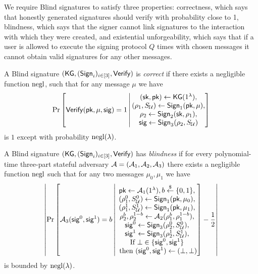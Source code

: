We require Blind signatures to satisfy three properties: correctness, which says that honestly generated signatures should verify with probability close to 1, blindness, which says that the signer cannot link signatures to the interaction with which they were created, and existential unforgeability, which says that if a user is allowed to execute the signing protocol $Q$ times with chosen messages it cannot obtain valid signatures for any other messages.

\begin{definition}[Correctness] \label{def:bs-correctness}
    A Blind signature $(\mathsf{KG},(\mathsf{Sign}_i)_{i\in [3]},\mathsf{Verify})$ is \emph{correct} if there exists a negligible function $\mathrm{negl}$, such that for any message $\mu$ we have \[
        \Pr \left[ \mathsf{Verify}(\mathsf{pk},\mu,\mathsf{sig}) = 1 \, \middle | \, \begin{matrix}
            (\mathsf{sk},\mathsf{pk}) \gets \mathsf{KG}(1^\lambda), \\
            (\rho_1, S_{\mathcal{U}}) \gets \mathsf{Sign}_1(\mathsf{pk}, \mu), \\
            \rho_2 \gets \mathsf{Sign}_2(\mathsf{sk}, \rho_1), \\
            \mathsf{sig} \gets \mathsf{Sign}_3(\rho_2, S_{\mathcal{U}})
        \end{matrix} \right]    
    \] 
    is  $1$  except with probability $\mathrm{negl}(\lambda)$.
\end{definition}


\begin{definition}[Blindness] \label{def:bs-blindness}
    A Blind signature $(\mathsf{KG},(\mathsf{Sign}_i)_{i\in [3]},\mathsf{Verify})$ has \emph{blindness} if for every polynomial-time three-part stateful adversary $\mathcal{A} = (\mathcal{A}_1, \mathcal{A}_2, \mathcal{A}_3)$ there exists a negligible function $\mathrm{negl}$ such that for any two messages $\mu_0, \mu_1$ we have \[
        \left| \Pr\left[ \mathcal{A}_3(\mathsf{sig}^0,\mathsf{sig}^1) = b \, \middle| \,
        \begin{matrix} 
            \mathsf{pk} \gets \mathcal{A}_1(1^\lambda), b \overset{\$}{\leftarrow} \{0,1\}, \\
            (\rho_1^0, S_{\mathcal{U}}^0) \gets \mathsf{Sign}_1(\mathsf{pk},\mu_0), \\ (\rho_1^1, S_{\mathcal{U}}^1) \gets \mathsf{Sign}_1(\mathsf{pk},\mu_1), \\
            \rho_2^b,\rho_2^{1-b} \gets \mathcal{A}_{2}( \rho_1^b, \rho_1^{1-b} ), \\
            \mathsf{sig}^0 \gets \mathsf{Sign}_3(\rho_2^0, S_{\mathcal{U}}^0), \\
            \mathsf{sig}^1 \gets \mathsf{Sign}_3(\rho_2^1, S_{\mathcal{U}}^1), \\
            \text{If } \bot \in \{ \mathsf{sig}^0,\mathsf{sig}^1\} \\  \text{ then } (\mathsf{sig}^0,\mathsf{sig}^{1}) \gets (\bot,\bot) \\
        \end{matrix} \right] - \frac{1}{2} \right|
    \]
    is bounded by $\mathrm{negl}(\lambda)$.
\end{definition} 



